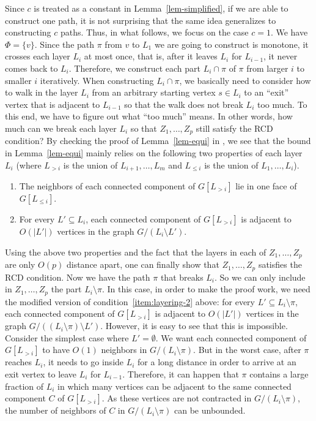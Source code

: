 \documentclass[a4paper,11pt]{article}
\numberwithin{lemma}{section}
\begin{document}
Since $c$ is treated as a constant in Lemma~\ref{lem-simplified}, if we are able to construct one path, it is not surprising that the same idea generalizes to constructing $c$ paths.
Thus, in what follows, we focus on the case $c = 1$.
We have $\varPhi = \{v\}$.
Since the path $\pi$ from $v$ to $L_1$ we are going to construct is monotone, it crosses each layer $L_i$ at most once, that is, after it leaves $L_i$ for $L_{i-1}$, it never comes back to $L_i$.
Therefore, we construct each part $L_i \cap \pi$ of $\pi$ from larger $i$ to smaller $i$ iteratively.
When constructing $L_i \cap \pi$, we basically need to consider how to walk in the layer $L_i$ from an arbitrary starting vertex $s \in L_i$ to an ``exit'' vertex that is adjacent to $L_{i-1}$ so that the walk does not break $L_i$ too much.
To this end, we have to figure out what ``too much'' means.
In other words, how much can we break each layer $L_i$ so that $Z_1,\dots,Z_p$ still satisfy the RCD condition?
By checking the proof of Lemma~\ref{lem-equi} in \cite{BandyapadhyayLLSJ22}, we see that the bound in Lemma~\ref{lem-equi} mainly relies on the following two properties of each layer $L_i$ (where $L_{>i}$ is the union of $L_{i+1},\dots,L_m$ and $L_{\leq i}$ is the union of $L_1,\dots,L_i$).
\begin{enumerate}[label = (\Roman*)]
 \item\label{item:layering-1} The neighbors of each connected component of $G[L_{>i}]$ lie in one face of $G[L_{\leq i}]$.
 \item\label{item:layering-2} For every $L' \subseteq L_i$, each connected component of $G[L_{>i}]$ is adjacent to $O(|L'|)$ vertices in the graph $G/(L_i \setminus L')$.
\end{enumerate}
Using the above two properties and the fact that the layers in each of $Z_1,\dots,Z_p$ are only $O(p)$ distance apart, one can finally show that $Z_1,\dots,Z_p$ satisfies the RCD condition.
Now we have the path $\pi$ that breaks $L_i$.
So we can only include in $Z_1,\dots,Z_p$ the part $L_i \setminus \pi$.
In this case, in order to make the proof work, we need the modified version of condition~\ref{item:layering-2} above: for every $L' \subseteq L_i \setminus \pi$, each connected component of $G[L_{>i}]$ is adjacent to $O(|L'|)$ vertices in the graph $G/((L_i \setminus \pi) \setminus L')$.
However, it is easy to see that this is impossible.
Consider the simplest case where $L' = \emptyset$.
We want each connected component of $G[L_{>i}]$ to have $O(1)$ neighbors in $G/(L_i \setminus \pi)$.
But in the worst case, after $\pi$ reaches $L_i$, it needs to go inside $L_i$ for a long distance in order to arrive at an exit vertex to leave $L_i$ for $L_{i-1}$.
Therefore, it can happen that $\pi$ contains a large fraction of $L_i$ in which many vertices can be adjacent to the same connected component $C$ of $G[L_{>i}]$.
As these vertices are not contracted in $G/(L_i \setminus \pi)$, the number of neighbors of $C$ in $G/(L_i \setminus \pi)$ can be unbounded.
\end{document}
